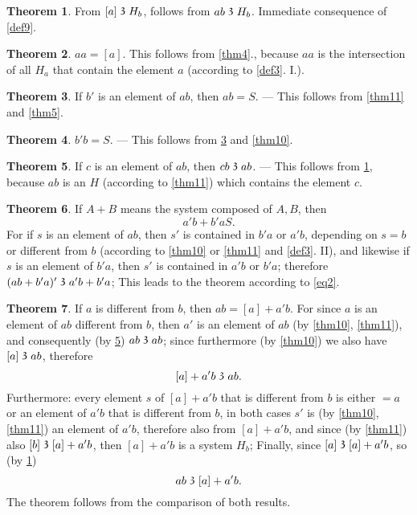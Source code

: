 \documentclass[leqno]{article}
\theoremstyle{definition}
\newtheorem{theorem}{Theorem}
\newcommand\partof{\mathrel{\raisebox{0.45ex}{$\mathfrak{3}$}}}
\begin{document}
\begin{theorem}\label{thm12}
 From $[a] \partof H_b$, follows from $ab \partof H_b$.
Immediate consequence of \ref{def9}. 
\end{theorem} 

\begin{theorem}\label{thm13}
$aa = [a]$.
This follows from \ref{thm4}., because $aa$ is the intersection of all $H_a$ that contain the element $a$ (according to \ref{def3}. I.).
\end{theorem}

\begin{theorem}\label{thm14}
If $b'$ is an element of $ab$, then $ab = S$. 
--- This follows from \ref{thm11} and \ref{thm5}. 
\end{theorem}


\begin{theorem}\label{thm15}
 $b' b = S$.
 --- This follows from \ref{thm14} and \ref{thm10}.
\end{theorem}

\begin{theorem}\label{thm16}
If $c$ is an element of $ab$, then $cb \partof ab$.
--- This follows from \ref{thm12}, because $ab$ is an $H$ (according to \ref{thm11}) which contains the element $c$.
\end{theorem}

\begin{theorem}\label{thm17}
If $A + B$ means the system composed of $A, B$, then 
\[
	a'b + b'a S.
\]
For if $s$ is an element of $ab$, then $s'$ is contained in $b'a$ or $a'b$, depending on $s = b$ or different from $b$ (according to \ref{thm10} or \ref{thm11} and \ref{def3}. II), and likewise if $s$ is an element of $b'a$, then $s'$ is contained in $a'b$ or $b'a$; therefore $(ab + b'a)' \partof a'b + b'a$; This leads to the theorem according to \eqref{eq2}.
\end{theorem}

\begin{theorem}\label{thm18}
If $a$ is different from $b$, then $ab = [a] + a'b$.
For since $a$ is an element of $ab$ different from $b$, then $a'$ is an element of $ab$ (by \ref{thm10}, \ref{thm11}), and consequently (by \ref{thm16}) $ab \partof ab$; since furthermore (by \ref{thm10}) we also have $[a] \partof ab$, therefore
\[
	[a] + a'b \partof ab.
\]
Furthermore: every element $s$ of $[a] + a'b$ that is different from $b$ is either $= a$ or an element of $a'b$ that is different from $b$, in both cases $s'$ is (by \ref{thm10}, \ref{thm11}) an element of $a'b$, therefore also from $[a]+ a'b$, and since (by \ref{thm11}) also $[b] \partof [a] + a'b$, then $[a] + a'b$ is a system $H_b$; Finally, since $[a] \partof [a] + a'b$, so (by \ref{thm12})
\[
	ab \partof [a] + a' b.
\]
The theorem follows from the comparison of both results.
\end{theorem}
\end{document}
